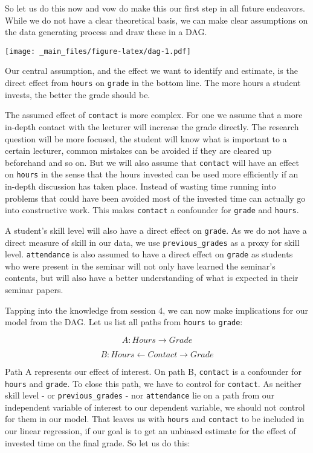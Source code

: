 \documentclass[
]{book}
\begin{document}
So let us do this now and vow do make this our first step in all future
endeavors. While we do not have a clear theoretical basis, we can make clear
assumptions on the data generating process and draw these in a DAG.

\texttt{[image: \_main\_files/figure-latex/dag-1.pdf]}

Our central assumption, and the effect we want to identify and estimate, is the
direct effect from \texttt{hours} on \texttt{grade} in the bottom line. The more hours a
student invests, the better the grade should be.

The assumed effect of \texttt{contact} is more complex. For one we assume that a more
in-depth contact with the lecturer will increase the grade directly. The
research question will be more focused, the student will know what is important
to a certain lecturer, common mistakes can be avoided if they are cleared up
beforehand and so on. But we will also assume that \texttt{contact} will have an effect
on \texttt{hours} in the sense that the hours invested can be used more efficiently if
an in-depth discussion has taken place. Instead of wasting time running into
problems that could have been avoided most of the invested time can actually go
into constructive work. This makes \texttt{contact} a confounder for \texttt{grade} and
\texttt{hours}.

A student's skill level will also have a direct effect on \texttt{grade}. As we do not
have a direct measure of skill in our data, we use \texttt{previous\_grades} as a proxy
for skill level. \texttt{attendance} is also assumed to have a direct effect on \texttt{grade}
as students who were present in the seminar will not only have learned the seminar's
contents, but will also have a better understanding of what is expected in their
seminar papers.

Tapping into the knowledge from session 4, we can now make implications for our
model from the DAG. Let us list all paths from \texttt{hours} to \texttt{grade}:

\[A: Hours \rightarrow Grade\]

\[B: Hours \leftarrow Contact \rightarrow Grade\]

Path A represents our effect of interest. On path B, \texttt{contact} is a confounder
for \texttt{hours} and \texttt{grade}. To close this path, we have to control for \texttt{contact}.
As neither skill level - or \texttt{previous\_grades} - nor \texttt{attendance} lie on a path
from our independent variable of interest to our dependent variable, we should
not control for them in our model.
That leaves us with \texttt{hours} and \texttt{contact} to be included in our linear
regression, if our goal is to get an unbiased estimate for the effect of
invested time on the final grade. So let us do this:
\end{document}
